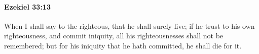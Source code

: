 
		\paragraph{Ezekiel 33:13} %
			\label{EZEKIEL-33-13}

			When I shall say to the righteous, that he shall surely live; if he trust to his own righteousness, and commit iniquity, all his righteousnesses shall not be remembered; but for his iniquity that he hath committed, he shall die for it.


